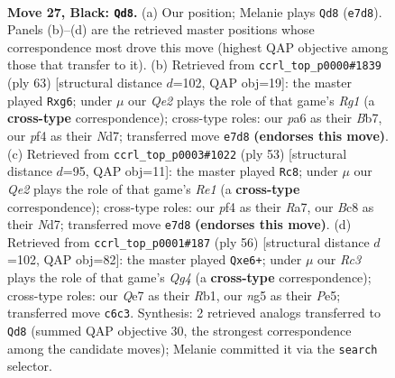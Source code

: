 \documentclass[11pt]{article}
\begin{document}
\clearpage

\begin{figure}[p]\centering
\begin{subfigure}{0.46\textwidth}\centering
\resizebox{\linewidth}{!}{%
\newchessgame
\chessboard[
  setfen={1Qb2k2/2p1qp1p/P1r2n2/3p2N1/5P2/8/2P3P1/R4RK1 b - - 1 27},
  showmover=false,
  pgfstyle=straightmove, color=movearrow, markmove={e7-d8}
]}
\caption{}
\end{subfigure}\hfill
\begin{subfigure}{0.46\textwidth}\centering
\resizebox{\linewidth}{!}{%
\newchessgame
\chessboard[
  setfen={6rk/1b1n4/p1q1p1Pp/8/p6Q/3nPP2/6P1/R1R3K1 b - - 8 32},
  showmover=false,
  pgfstyle=straightmove, color=movearrow, markmove={g8-g6}
]}
\caption{}
\end{subfigure}
\\[4pt]
\begin{subfigure}{0.46\textwidth}\centering
\resizebox{\linewidth}{!}{%
\newchessgame
\chessboard[
  setfen={4r1k1/r2n1pp1/5q1p/2p5/2Q2P2/4P3/5PBP/2RR2K1 b - - 0 27},
  showmover=false,
  pgfstyle=straightmove, color=movearrow, markmove={e8-c8}
]}
\caption{}
\end{subfigure}\hfill
\begin{subfigure}{0.46\textwidth}\centering
\resizebox{\linewidth}{!}{%
\newchessgame
\chessboard[
  setfen={2kr2nr/2p4p/p1p1p3/4P2N/6Q1/3p4/5PP1/1R2KB1q w - - 0 29},
  showmover=false,
  pgfstyle=straightmove, color=movearrow, markmove={g4-e6}
]}
\caption{}
\end{subfigure}
\caption{\textbf{Move 27, Black: \texttt{Qd8}.} (a) Our position; Melanie plays \texttt{Qd8} (\texttt{e7d8}). Panels (b)--(d) are the retrieved master positions whose correspondence most drove this move (highest QAP objective among those that transfer to it). (b) Retrieved from \texttt{ccrl\_top\_p0000\#1839} (ply 63) [structural distance $d$=102, QAP obj=19]: the master played \texttt{Rxg6}; under $\mu$ our \emph{Qe2} plays the role of that game's \emph{Rg1} (a \textbf{cross-type} correspondence); cross-type roles: our \emph{p}a6 as their \emph{B}b7, our \emph{p}f4 as their \emph{N}d7; transferred move \texttt{e7d8} \textbf{(endorses this move)}. (c) Retrieved from \texttt{ccrl\_top\_p0003\#1022} (ply 53) [structural distance $d$=95, QAP obj=11]: the master played \texttt{Rc8}; under $\mu$ our \emph{Qe2} plays the role of that game's \emph{Re1} (a \textbf{cross-type} correspondence); cross-type roles: our \emph{p}f4 as their \emph{R}a7, our \emph{B}c8 as their \emph{N}d7; transferred move \texttt{e7d8} \textbf{(endorses this move)}. (d) Retrieved from \texttt{ccrl\_top\_p0001\#187} (ply 56) [structural distance $d$=102, QAP obj=82]: the master played \texttt{Qxe6+}; under $\mu$ our \emph{Rc3} plays the role of that game's \emph{Qg4} (a \textbf{cross-type} correspondence); cross-type roles: our \emph{Q}e7 as their \emph{R}b1, our \emph{n}g5 as their \emph{P}e5; transferred move \texttt{c6c3}. Synthesis: 2 retrieved analogs transferred to \texttt{Qd8} (summed QAP objective 30, the strongest correspondence among the candidate moves); Melanie committed it via the \texttt{search} selector.}
\label{fig:thought-m53}
\end{figure}
\end{document}
